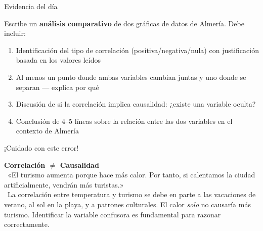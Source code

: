 \documentclass[aspectratio=169, 10pt, spanish]{beamer}
\begin{document}
\begin{frame}{Evidencia del día}
  \begin{evidenciabox}
    Escribe un \textbf{análisis comparativo} de dos gráficas de
    datos de Almería. Debe incluir:
    \begin{enumerate}
      \item Identificación del tipo de correlación (positiva/negativa/nula)
            con justificación basada en los valores leídos
      \item Al menos un punto donde ambas variables cambian juntas
            y uno donde se separan — explica por qué
      \item Discusión de si la correlación implica causalidad:
            ¿existe una variable oculta?
      \item Conclusión de 4--5 líneas sobre la relación entre
            las dos variables en el contexto de Almería
    \end{enumerate}
  \end{evidenciabox}
\end{frame}

\begin{frame}{¡Cuidado con este error!}
  \begin{errorbox}
    \textbf{Correlación $\neq$ Causalidad}\\[6pt]
    \incorrecto\ «El turismo aumenta porque hace más calor.
    Por tanto, si calentamos la ciudad artificialmente,
    vendrán más turistas.»\\[6pt]
    \correcto\ La correlación entre temperatura y turismo se debe en
    parte a las vacaciones de verano, al sol en la playa, y a
    patrones culturales. El calor \textit{solo} no causaría más turismo.
    Identificar la variable confusora es fundamental para
    razonar correctamente.
  \end{errorbox}
\end{frame}
\end{document}
